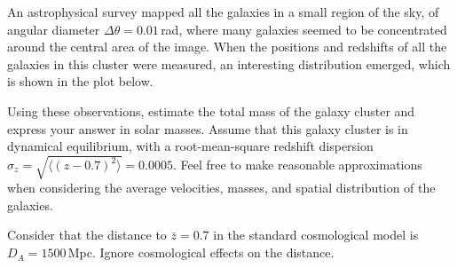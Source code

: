 An astrophysical survey mapped all the galaxies in a small region of the sky,
of angular diameter $\Delta\theta = 0.01$\,rad, where many galaxies seemed to
be concentrated around the central area of the image. When the positions and
redshifts of all the galaxies in this cluster were measured, an interesting
distribution emerged, which is shown in the plot below.


Using these observations, estimate the total mass of the galaxy cluster and
express your answer in solar masses. Assume that this galaxy cluster is in
dynamical equilibrium, with a root-mean-square redshift dispersion
$\sigma_z = \sqrt{\langle (z - 0.7)^2 \rangle} = 0.0005$. Feel free to make
reasonable approximations when considering the average velocities, masses, and
spatial distribution of the galaxies.

Consider that the distance to $\bar{z} = 0.7$ in the standard cosmological
model is $D_A = 1500$\,Mpc. Ignore cosmological effects on the distance.
